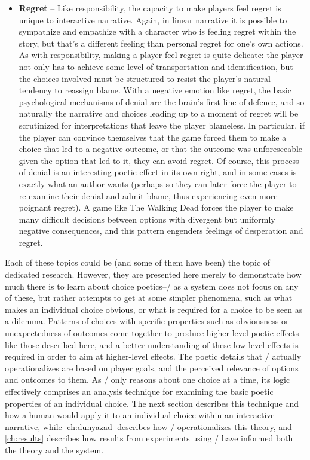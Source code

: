 \begin{itemize}
  \item \textbf{Regret} -- Like responsibility, the capacity to make players feel regret is unique to interactive narrative.
%
Again, in linear narrative it is possible to sympathize and empathize with a character who is feeling regret within the story, but that's a different feeling than personal regret for one's own actions.
%
As with responsibility, making a player feel regret is quite delicate: the player not only has to achieve some level of transportation and identification, but the choices involved must be structured to resist the player's natural tendency to reassign blame.
%
With a negative emotion like regret, the basic psychological mechanisms of denial are the brain's first line of defence, and so naturally the narrative and choices leading up to a moment of regret will be scrutinized for interpretations that leave the player blameless.
%
In particular, if the player can convince themselves that the game forced them to make a choice that led to a negative outcome, or that the outcome was unforeseeable given the option that led to it, they can avoid regret.
%
Of course, this process of denial is an interesting poetic effect in its own right, and in some cases is exactly what an author wants (perhaps so they can later force the player to re-examine their denial and admit blame, thus experiencing even more poignant regret).
%
A game like The Walking Dead \citep{TheWalkingDead} forces the player to make many difficult decisions between options with divergent but uniformly negative consequences, and this pattern engenders feelings of desperation and regret.

\end{itemize}


Each of these topics could be (and some of them have been) the topic of dedicated research.
%
However, they are presented here merely to demonstrate how much there is to learn about choice poetics--\dunyazad/ as a system does not focus on any of these, but rather attempts to get at some simpler phenomena, such as what makes an individual choice obvious, or what is required for a choice to be seen as a dilemma.
%
Patterns of choices with specific properties such as obviousness or unexpectedness of outcomes come together to produce higher-level poetic effects like those described here, and a better understanding of these low-level effects is required in order to aim at higher-level effects.
%
The poetic details that \dunyazad/ actually operationalizes are based on player goals, and the perceived relevance of options and outcomes to them.
%
As \dunyazad/ only reasons about one choice at a time, its logic effectively comprises an analysis technique for examining the basic poetic properties of an individual choice.
%
The next section describes this technique and how a human would apply it to an individual choice within an interactive narrative, while \cref{ch:dunyazad} describes how \dunyazad/ operationalizes this theory, and \cref{ch:results} describes how results from experiments using \dunyazad/ have informed both the theory and the system.


